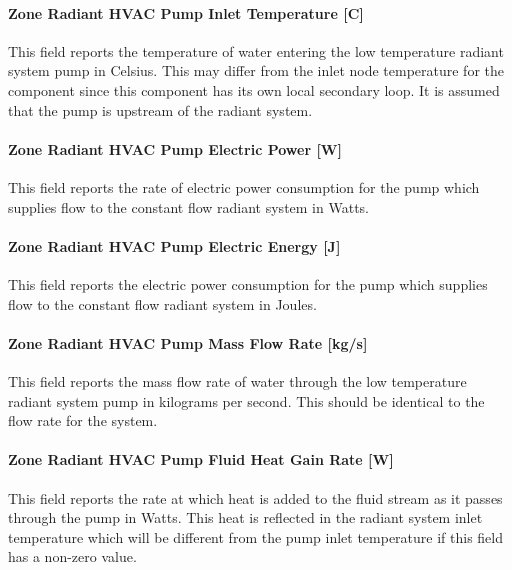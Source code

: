 \paragraph{Zone Radiant HVAC Pump Inlet Temperature {[}C{]}}\label{zone-radiant-hvac-pump-inlet-temperature-c}

This field reports the temperature of water entering the low temperature radiant system pump in Celsius. This may differ from the inlet node temperature for the component since this component has its own local secondary loop. It is assumed that the pump is upstream of the radiant system.

\paragraph{Zone Radiant HVAC Pump Electric Power {[}W{]}}\label{zone-radiant-hvac-pump-electric-power-w}

This field reports the rate of electric power consumption for the pump which supplies flow to the constant flow radiant system in Watts.

\paragraph{Zone Radiant HVAC Pump Electric Energy {[}J{]}}\label{zone-radiant-hvac-pump-electric-energy-j}

This field reports the electric power consumption for the pump which supplies flow to the constant flow radiant system in Joules.

\paragraph{Zone Radiant HVAC Pump Mass Flow Rate {[}kg/s{]}}\label{zone-radiant-hvac-pump-mass-flow-rate-kgs}

This field reports the mass flow rate of water through the low temperature radiant system pump in kilograms per second. This should be identical to the flow rate for the system.

\paragraph{Zone Radiant HVAC Pump Fluid Heat Gain Rate {[}W{]}}\label{zone-radiant-hvac-pump-fluid-heat-gain-rate-w}

This field reports the rate at which heat is added to the fluid stream as it passes through the pump in Watts. This heat is reflected in the radiant system inlet temperature which will be different from the pump inlet temperature if this field has a non-zero value.

